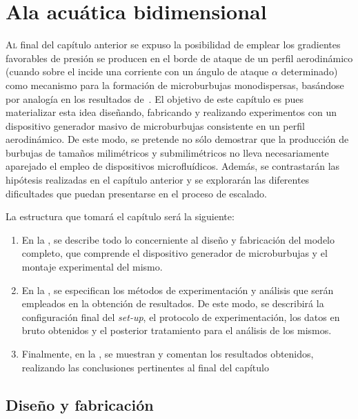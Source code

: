 \chapter{Ala acuática bidimensional}
\pagestyle{esitscCD}
\epigraph{ }{}

\lettrine[lraise=-0.1, lines=2, loversize=0.25]{A}l final del capítulo anterior se expuso la posibilidad de emplear los gradientes favorables de presión se producen en el borde de ataque de un perfil aerodinámico (cuando sobre el incide una corriente con un ángulo de ataque $\alpha$ determinado) como mecanismo para la formación de microburbujas monodispersas, basándose por analogía en los resultados de~\cite{Evangelio2015b}. El objetivo de este capítulo es pues materializar esta idea diseñando, fabricando y realizando experimentos con un dispositivo generador masivo de microburbujas consistente en un perfil aerodinámico. De este modo, se pretende no sólo demostrar que la producción de burbujas de tamaños milimétricos y submilimétricos no lleva necesariamente aparejado el empleo de dispositivos microfluídicos. Además, se contrastarán las hipótesis realizadas en el capítulo anterior y se explorarán las diferentes dificultades que puedan presentarse en el proceso de escalado. 

La estructura que tomará el capítulo será la siguiente: 
\begin{enumerate}
\item En la , se describe todo lo concerniente al diseño y fabricación del modelo completo, que comprende el dispositivo generador de microburbujas y el montaje experimental del mismo. 
\item En la , se especifican los métodos de experimentación y análisis que serán empleados en la obtención de resultados. De este modo, se describirá la configuración final del \textit{set-up}, el protocolo de experimentación, los datos en bruto obtenidos y el posterior tratamiento para el análisis de los mismos.
\item Finalmente, en  la , se muestran y comentan los resultados obtenidos, realizando las conclusiones pertinentes al final del capítulo
\end{enumerate}

\section{Diseño y fabricación}


